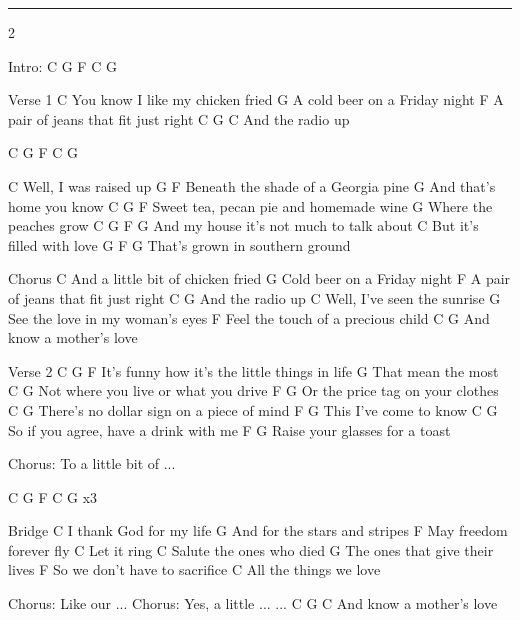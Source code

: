 \noindent\rule{\columnwidth}{1pt}

\begin{multicols}{2}
\begin{lstsong}
Intro: C G F C G

Verse 1
                     C
You know I like my chicken fried
                  G
A cold beer on a Friday night
                     F
A pair of jeans that fit just right
              C  G  C
And the radio up

C G F C G

             C
Well, I was raised up
             G                  F
Beneath the shade of a Georgia pine
             G
And that's home you know
C                G                F
Sweet tea, pecan pie and homemade wine
            G
Where the peaches grow
     C                 G            F    G
And my house it's not much to talk about
          C
But it's filled with love
        G                 F   G
That's grown in southern ground

Chorus
                          C
And a little bit of chicken fried
                G
Cold beer on a Friday night
                     F
A pair of jeans that fit just right
              C   G
And the radio up
                    C
Well, I've seen the sunrise
                   G
See the love in my woman's eyes
                     F
Feel the touch of a precious child
                    C    G
And know a mother's love
\end{lstsong}
\columnbreak
\begin{lstsong}
Verse 2
       C                 G                 F
It's funny how it's the little things in life
      G
That mean the most
     C                 G
Not where you live or what you drive
        F                G
Or the price tag on your clothes
           C                G
There's no dollar sign on a piece of mind
 F                G
This I've come to know
       C                 G
So if you agree, have a drink with me
           F              G
Raise your glasses for a toast

Chorus: To a little bit of ...

C G F C G x3

Bridge
             C
I thank God for my life
             G
And for the stars and stripes
             F
May freedom forever fly
       C
Let it ring
           C
Salute the ones who died
              G
The ones that give their lives
                    F
So we don't have to sacrifice
                   C
All the things we love

Chorus: Like our ...
Chorus: Yes, a little ...
...
                    C    G   C
And know a mother's love
\end{lstsong}
\end{multicols}
\newpage

